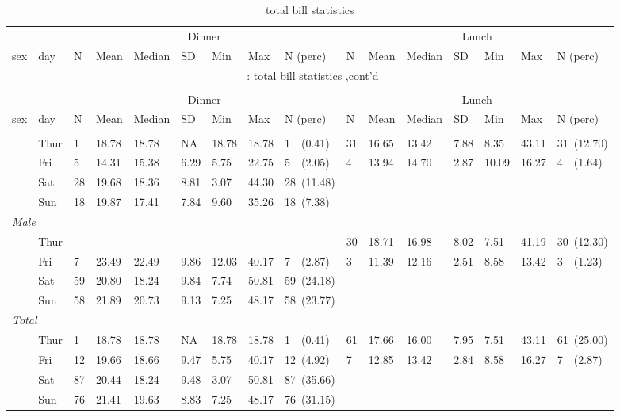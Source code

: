 \documentclass{article}
\begin{document}
\begin{longtable}{llllllllllllllll}
\caption{total bill statistics}\\
\toprule
&&
\multicolumn{7}{c}{Dinner}&\multicolumn{7}{c}{Lunch} \\
\cmidrule(lr){3-9} \cmidrule(lr){10-16}
sex & day & N & Mean & Median & SD & Min & Max & N (perc) & N & Mean & Median & SD & Min & Max & N (perc) \\
\hline
\endfirsthead
\multicolumn{16}{c}{\tablename~\thetable{}: total bill statistics ,cont'd}\\\\
\toprule
&&
\multicolumn{7}{c}{Dinner}&\multicolumn{7}{c}{Lunch} \\
\cmidrule(lr){3-9} \cmidrule(lr){10-16}
sex & day & N & Mean & Median & SD & Min & Max & N (perc) & N & Mean & Median & SD & Min & Max & N (perc) \\
\hline
\endhead \hline \endfoot \hline

\endlastfoot
\multicolumn{ 15 }{l}{\textit{ Female }}\\
& Thur & 1 & 18.78 & 18.78 &  NA & 18.78 & 18.78 & 1~~(0.41) & 31 & 16.65 & 13.42 & 7.88 & 8.35 & 43.11 & 31~(12.70) \\
 & Fri & 5 & 14.31 & 15.38 & 6.29 & 5.75 & 22.75 & 5~~(2.05) & 4 & 13.94 & 14.70 & 2.87 & 10.09 & 16.27 & 4~~(1.64) \\
 & Sat & 28 & 19.68 & 18.36 & 8.81 & 3.07 & 44.30 & 28~(11.48) &  &  &  &  &  &  &  \\
 & Sun & 18 & 19.87 & 17.41 & 7.84 & 9.60 & 35.26 & 18~(7.38) &  &  &  &  &  &  &  \\
\multicolumn{ 15 }{l}{\textit{ Male }}\\
& Thur &  &  &  &  &  &  &  & 30 & 18.71 & 16.98 & 8.02 & 7.51 & 41.19 & 30~(12.30) \\
 & Fri & 7 & 23.49 & 22.49 & 9.86 & 12.03 & 40.17 & 7~~(2.87) & 3 & 11.39 & 12.16 & 2.51 & 8.58 & 13.42 & 3~~(1.23) \\
 & Sat & 59 & 20.80 & 18.24 & 9.84 & 7.74 & 50.81 & 59~(24.18) &  &  &  &  &  &  &  \\
 & Sun & 58 & 21.89 & 20.73 & 9.13 & 7.25 & 48.17 & 58~(23.77) &  &  &  &  &  &  &  \\
\multicolumn{ 15 }{l}{\textit{ Total }}\\
& Thur & 1 & 18.78 & 18.78 &  NA & 18.78 & 18.78 & 1~~(0.41) & 61 & 17.66 & 16.00 & 7.95 & 7.51 & 43.11 & 61~(25.00) \\
 & Fri & 12 & 19.66 & 18.66 & 9.47 & 5.75 & 40.17 & 12~(4.92) & 7 & 12.85 & 13.42 & 2.84 & 8.58 & 16.27 & 7~~(2.87) \\
 & Sat & 87 & 20.44 & 18.24 & 9.48 & 3.07 & 50.81 & 87~(35.66) &  &  &  &  &  &  &  \\
 & Sun & 76 & 21.41 & 19.63 & 8.83 & 7.25 & 48.17 & 76~(31.15) &  &  &  &  &  &  &  \\
\end{longtable}
\newpage
\renewcommand{\figurename}{} \renewcommand\thefigure{{plot A}}
\end{document}
